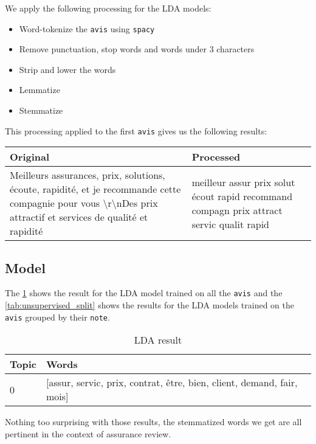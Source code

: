 \documentclass[a4paper, 12pt, one column]{article}
\begin{document}
We apply the following processing for the LDA models:
\begin{itemize}
    \item Word-tokenize the \lstinline{avis} using \lstinline{spacy}
    \item Remove punctuation, stop words and words under 3 characters
    \item Strip and lower the words
    \item Lemmatize
    \item Stemmatize
\end{itemize}

This processing applied to the first \lstinline{avis} gives us the following results: 

\begin{table}[H]
\centering
\begin{tabular}{|p{7cm}|p{7cm}|}
\hline
\textbf{Original} &
  \textbf{Processed} \\ \hline
Meilleurs assurances, prix, solutions, écoute, rapidité, et je recommande cette compagnie pour vous \textbackslash{}r\textbackslash{}nDes prix attractif et services de qualité et rapidité  &
  meilleur assur prix solut écout rapid recommand compagn prix attract servic qualit rapid \\ \hline
\end{tabular}
\end{table}

\newpage
\subsection{Model}

The \cref{tab:unsupervised} shows the result for the LDA model trained on all the \lstinline{avis} and the \cref{tab:unsupervised_split} shows the results for the LDA models trained on the \lstinline{avis} grouped by their \lstinline{note}. 

\begin{table}[H]
\centering
\begin{tabular}{|p{1cm}|p{13cm}|}
\hline
 \textbf{Topic} &                                                                  \textbf{Words} \\
\hline
     0 & [assur, servic, prix, contrat, être, bien, client, demand, fair, mois] \\
\hline
\end{tabular}
\label{tab:unsupervised}
\caption{LDA result}
\end{table}

Nothing too surprising with those results, the stemmatized words we get are all pertinent in the context of assurance review. 
\end{document}
